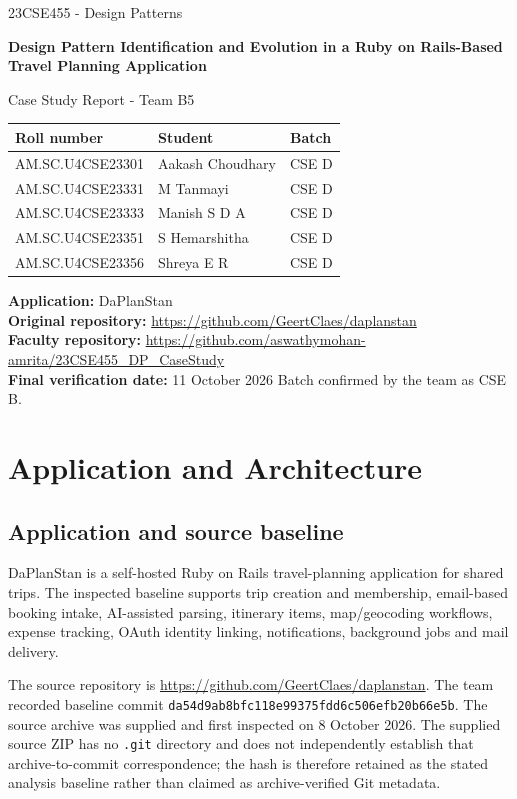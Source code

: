\documentclass[11pt,a4paper]{article}
\renewcommand{\_}{\textunderscore\allowbreak}
\begin{document}
\begin{titlepage}
\centering
{\Large 23CSE455 - Design Patterns\par}
\vspace{0.8cm}
{\LARGE\bfseries Design Pattern Identification and Evolution in a Ruby on Rails-Based Travel Planning Application\par}
\vspace{0.8cm}
{\Large Case Study Report - Team B5\par}
\vspace{1.1cm}
\begin{tabular}{lll}
\toprule
Roll number & Student & Batch \\
\midrule
AM.SC.U4CSE23301 & Aakash Choudhary &  CSE D \\
AM.SC.U4CSE23331 & M Tanmayi &  CSE D \\
AM.SC.U4CSE23333 & Manish S D A &  CSE D \\
AM.SC.U4CSE23351 & S Hemarshitha &  CSE D \\
AM.SC.U4CSE23356 & Shreya E R &  CSE D \\
\bottomrule
\end{tabular}
\vfill
\textbf{Application:} DaPlanStan\\
\textbf{Original repository:} \url{https://github.com/GeertClaes/daplanstan}\\
\textbf{Faculty repository:} \url{https://github.com/aswathymohan-amrita/23CSE455_DP_CaseStudy}\\
\textbf{Final verification date:} 11 October 2026
\vfill
{\small Batch confirmed by the team as CSE B.}
\end{titlepage}
\tableofcontents
\newpage

\section{Application and Architecture}
\subsection{Application and source baseline}
DaPlanStan is a self-hosted Ruby on Rails travel-planning application for shared trips. The inspected baseline supports trip creation and membership, email-based booking intake, AI-assisted parsing, itinerary items, map/geocoding workflows, expense tracking, OAuth identity linking, notifications, background jobs and mail delivery.

The source repository is \url{https://github.com/GeertClaes/daplanstan}. The team recorded baseline commit \texttt{da54d9ab8bfc118e99375fdd6c506efb20b66e5b}. The source archive was supplied and first inspected on 8 October 2026. The supplied source ZIP has no \texttt{.git} directory and does not independently establish that archive-to-commit correspondence; the hash is therefore retained as the stated analysis baseline rather than claimed as archive-verified Git metadata.
\end{document}
